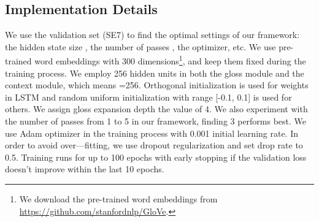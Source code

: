 \documentclass[11pt,a4paper]{article}
\begin{document}
\subsection{Implementation Details}
We use the validation set (SE7) to find the optimal settings of our framework: the hidden state size , the number of passes , the optimizer, etc.
We use pre-trained word embeddings with 300 dimensions\footnote{We download the pre-trained word embeddings from \url{https://github.com/stanfordnlp/GloVe}.}, and keep them fixed during the training process.
We employ 256 hidden units in both the gloss module and the context module, which means =256.
Orthogonal initialization is used for weights in LSTM and random uniform initialization with range [-0.1, 0.1] is used for others.
We assign gloss expansion depth  the value of 4.
We also experiment with the number of passes  from 1 to 5 in our framework, finding  3 performs best.
We use Adam optimizer \cite{Kingma2014Adam} in the training process with 0.001 initial learning rate.
In order to avoid over—fitting, we use dropout regularization and set drop rate to 0.5.
Training runs for up to 100 epochs with early stopping if the validation loss doesn't improve within the last 10 epochs.
\end{document}
